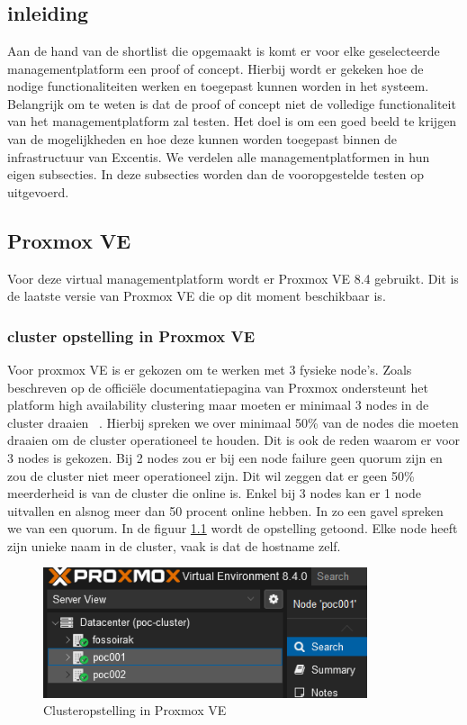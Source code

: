 
\chapter{}%
\label{ch:poc}

\section{inleiding}%
Aan de hand van de shortlist die opgemaakt is komt er voor elke geselecteerde managementplatform een proof of concept. Hierbij wordt er gekeken hoe de nodige functionaliteiten werken en toegepast kunnen worden in het systeem.
Belangrijk om te weten is dat de proof of concept niet de volledige functionaliteit van het managementplatform zal testen. Het doel is om een goed beeld te krijgen van de mogelijkheden en hoe deze kunnen worden toegepast binnen de infrastructuur van Excentis. 
We verdelen alle managementplatformen in hun eigen subsecties. In deze subsecties worden dan de vooropgestelde testen op uitgevoerd.
\section{Proxmox VE}%

Voor deze virtual managementplatform wordt er Proxmox VE 8.4 gebruikt. Dit is de laatste versie van Proxmox VE die op dit moment beschikbaar is.
\subsection{cluster opstelling in Proxmox VE}
Voor proxmox VE is er gekozen om te werken met 3 fysieke node's. Zoals beschreven op de officiële documentatiepagina van Proxmox ondersteunt het platform high availability clustering maar moeten er minimaal 3 nodes in de cluster draaien ~\autocite{proxmoxHA}.
Hierbij spreken we over minimaal 50\% van de nodes die moeten draaien om de cluster operationeel te houden. Dit is ook de reden waarom er voor 3 nodes is gekozen.
Bij 2 nodes zou er bij een node failure geen quorum zijn en zou de cluster niet meer operationeel zijn. Dit wil zeggen dat er geen 50\% meerderheid is van de cluster die online is. Enkel bij 3 nodes kan er 1 node uitvallen en alsnog meer dan 50 procent online hebben. In zo een gavel spreken we van een quorum.
In de figuur \ref{fig:cluster-proxmox} wordt de opstelling getoond. Elke node heeft zijn unieke naam in de cluster, vaak is dat de hostname zelf.
\begin{figure}[H]
  \centering
  \includegraphics[width=0.85\textwidth]{../poc/cluster-info-prox.png}
  \caption{Clusteropstelling in Proxmox VE}
  \label{fig:cluster-proxmox}
\end{figure}
